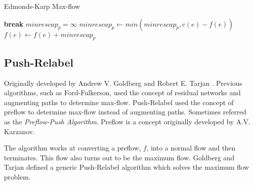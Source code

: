 \begin{algorithm}[!t]
	\caption{Edmonds-Karp Max-flow}\label{alg:dinic}
	\begin{algorithmic}[1]
			\State \textbf{break}
			\EndIf
			\newline
			\State $minrescap_p = \infty$
			\State $minrescap_p \gets min(minrescap_p,c(e)-f(e))$
			\EndFor
			\newline
			\State $f(e) \gets f(e) + minrescap_p$
			\EndFor
			\EndWhile\label{dinicwhile}
		\EndProcedure
	\end{algorithmic}
\end{algorithm}


\subsection{Push-Relabel}
\label{sec:PushRelabel}

Originally developed by Andrew V. Goldberg and Robert E. Tarjan \cite{Goldberg1988}. Previous algorithms, such as Ford-Fulkerson, used the concept of residual networks and augmenting paths to determine max-flow.
Push-Relabel used the concept of preflow to determine  max-flow instead of augmenting paths. Sometimes referred as the \textit{Preflow-Push Algorithm}.
Preflow is a concept originally developed by A.V. Karzanov.

The algorithm works at converting a preflow, $f$, into a normal flow and then terminates. This flow also turns out to be the maximum flow. Goldberg and Tarjan defined a generic Push-Relabel algorithm  which solves the maximum flow problem.

